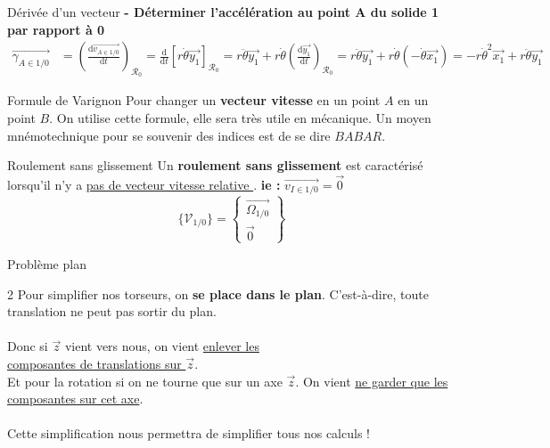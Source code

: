 \documentclass{article} %
\begin{document}
{\begin{exemple}{Dérivée d'un vecteur}
\noindent \textbf{- Déterminer l'accélération au point A du solide 1 par rapport à 0}
\begin{align*}
\overrightarrow{\gamma_{A\in 1/0}} &= \left(\frac{\mathrm{d}\overrightarrow{v_{A\in 1/0}}}{\mathrm{d}t}\right)_{\mathcal{R}_0} = \frac{\mathrm{d}}{\mathrm{d}t}\left[ r\dot{\theta}\vec{y_1} \right]_{\mathcal{R}_0} = r\ddot{\theta}\vec{y_1} + r\dot{\theta}\left(\frac{\mathrm{d}\vec{y_1}}{\mathrm{d}t}\right)_{\mathcal{R}_0} = r\ddot{\theta}\vec{y_1} + r\dot{\theta}(-\dot{\theta}\vec{x_1}) = \boxed{-r\dot{\theta}^2\vec{x_1} + r\ddot{\theta}\vec{y_1}}
\end{align*}
\end{exemple}
\begin{propriété}{Formule de Varignon}
Pour changer un \textbf{vecteur vitesse} en un point $A$ en un point $B$.
On utilise cette formule, elle sera très utile en mécanique.\vspace{-3pt}
Un moyen mnémotechnique pour se souvenir des indices est de se dire $BABAR$.
\end{propriété}
\begin{definition}{Roulement sans glissement}
Un \textbf{roulement sans glissement} est caractérisé lorsqu'il n'y a \underline{pas de vecteur vitesse relative }.
\textbf{ie :} $\overrightarrow{v_{I\in1/0}}=\overrightarrow{0}$
$$\{\mathcal{V}_{1/0}\}=\begin{Bmatrix}
\overrightarrow{\Omega_{1/0}}\\
\overrightarrow{0}
\end{Bmatrix}$$
\end{definition}\pagebreak
\begin{méthode}{Problème plan}
\begin{multicols}{2}
Pour simplifier nos torseurs, on \textbf{se place dans le plan}.
C'est-à-dire, toute translation ne peut pas sortir du plan.\\\\ Donc si $\overrightarrow{z}$ vient vers nous, on vient \underline{enlever les}\\
\underline{composantes de translations sur $\overrightarrow{z}$}.\\
Et pour la rotation si on ne tourne que sur un axe $\overrightarrow{z}$.
On vient \underline{ne garder que les composantes sur cet axe}.\\\\
Cette simplification nous permettra de simplifier tous nos calculs !\columnbreak

\end{multicols}
\end{méthode}}
\end{document}
